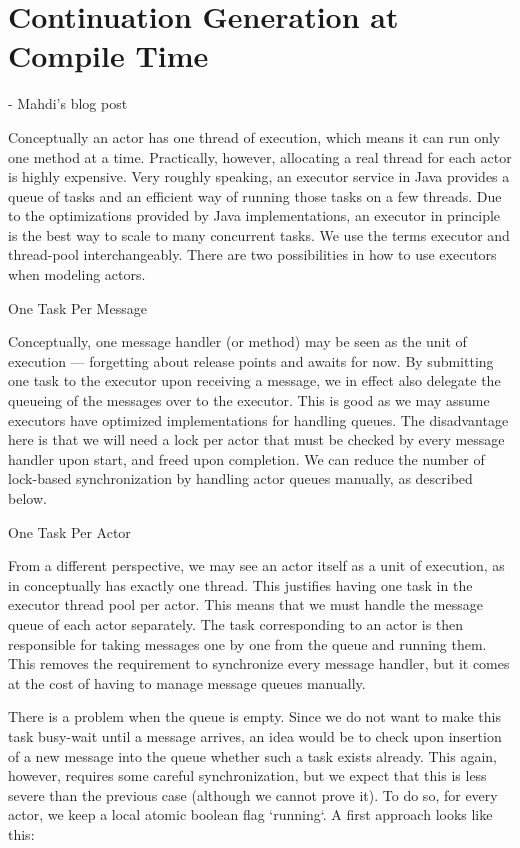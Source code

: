 \section{Continuation Generation at Compile Time}
\label{comp}
- Mahdi's blog post 

Conceptually an actor has one thread of execution, which means it can run only one method at a time. Practically, however, allocating a real thread for each actor is highly expensive. Very roughly speaking, an executor service in Java provides a queue of tasks and an efficient way of running those tasks on a few threads. Due to the optimizations provided by Java implementations, an executor in principle is the best way to scale to many concurrent tasks. We use the terms executor and thread-pool interchangeably. There are two possibilities in how to use executors when modeling actors.

One Task Per Message

Conceptually, one message handler (or method) may be seen as the unit of execution — forgetting about release points and awaits for now. By submitting one task to the executor upon receiving a message, we in effect also delegate the queueing of the messages over to the executor. This is good as we may assume executors have optimized implementations for handling queues. The disadvantage here is that we will need a lock per actor that must be checked by every message handler upon start, and freed upon completion. We can reduce the number of lock-based synchronization by handling actor queues manually, as described below.

One Task Per Actor

From a different perspective, we may see an actor itself as a unit of execution, as in conceptually has exactly one thread. This justifies having one task in the executor thread pool per actor. This means that we must handle the message queue of each actor separately. The task corresponding to an actor is then responsible for taking messages one by one from the queue and running them. This removes the requirement to synchronize every message handler, but it comes at the cost of having to manage message queues manually.

There is a problem when the queue is empty. Since we do not want to make this task busy-wait until a message arrives, an idea would be to check upon insertion of a new message into the queue whether such a task exists already. This again, however, requires some careful synchronization, but we expect that this is less severe than the previous case (although we cannot prove it). To do so, for every actor, we keep a local atomic boolean flag `running`. A first approach looks like this:

